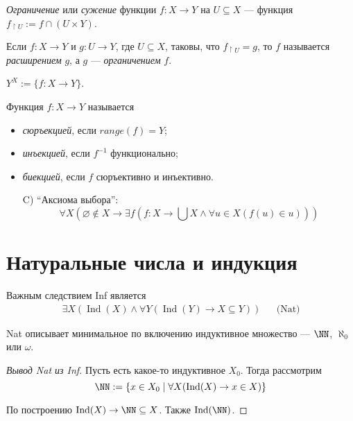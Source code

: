 \documentclass[12pt,a4paper]{article}
\DeclareMathOperator{\Ind}{Ind}
\begin{document}
    \begin{definition}
        \emph{Ограничение} или \emph{сужение} функции $f: X \to Y$ на $U \subseteq X$ --- функция $f_{\upharpoonright U} := f \cap (U \times Y)$.
        
        Если $f: X \to Y$ и $g: U \to Y$, где $U \subseteq X$, таковы, что $f_{\upharpoonright U} = g$, то $f$ называется \emph{расширением} $g$, а $g$ --- \emph{органичением} $f$.
    \end{definition}

    \begin{definition}
        $Y^X := \{f: X \to Y\}$.
    \end{definition}

    \begin{definition}
        Функция $f: X \to Y$ называется 
        \begin{itemize}
            \item \emph{сюръекцией},  если $range(f) = Y$;
            \item \emph{инъекцией}, если $f^{-1}$ функционально;
            \item \emph{биекцией}, если $f$ сюръективно и инъективно.
        \end{itemize}
    \end{definition}

    \begin{itemize}
        \item[C)] ``Аксиома выбора'':
            \[\forall X (\varnothing \notin X \to \exists f (f: X \to \bigcup X \wedge \forall u \in X (f(u) \in u)))\]
    \end{itemize}

    \section{Натуральные числа и индукция}

    Важным следствием Inf является
    \begin{align*}
        \exists X (\Ind(X) \wedge \forall Y (\Ind(Y) \to X \subseteq Y))&& \text{(Nat)}
    \end{align*}

    Nat описывает минимальное по включению индуктивное множество --- $\NN$, $\aleph_0$ или $\omega$.

    \begin{proof}[Вывод Nat из Inf]
        Пусть есть какое-то индуктивное $X_0$. Тогда рассмотрим
        \[\NN := \{x \in X_0 \mid \forall X (\Ind(X) \to x \in X)\}\]

        По построению $\Ind(X) \rightarrow \NN \subseteq X$. Также $\Ind(\NN)$.
    \end{proof}
\end{document}
